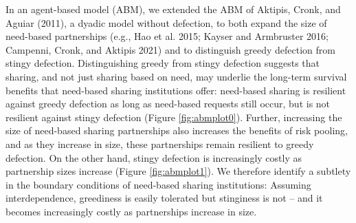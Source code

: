 \documentclass[
]{article}
\begin{document}
In an agent-based model (ABM), we extended the ABM of Aktipis, Cronk, and Aguiar (2011), a dyadic model without defection, to both expand the size of need-based partnerships (e.g., Hao et al. 2015; Kayser and Armbruster 2016; Campenni, Cronk, and Aktipis 2021) and to distinguish greedy defection from stingy defection. Distinguishing greedy from stingy defection suggests that sharing, and not just sharing based on need, may underlie the long-term survival benefits that need-based sharing institutions offer: need-based sharing is resilient against greedy defection as long as need-based requests still occur, but is not resilient against stingy defection (Figure \ref{fig:abmplot0}). Further, increasing the size of need-based sharing partnerships also increases the benefits of risk pooling, and as they increase in size, these partnerships remain resilient to greedy defection. On the other hand, stingy defection is increasingly costly as partnership sizes increase (Figure \ref{fig:abmplot1}). We therefore identify a subtlety in the boundary conditions of need-based sharing institutions: Assuming interdependence, greediness is easily tolerated but stinginess is not -- and it becomes increasingly costly as partnerships increase in size.
\end{document}
